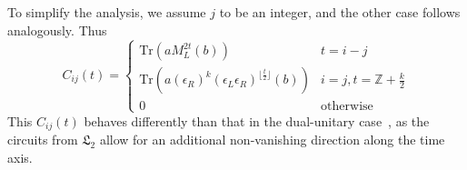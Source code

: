 \documentclass[aps,prx,twocolumn,notitlepage,nofootinbib,nobalancelastpage]{revtex4-2}
\theoremstyle{break}
\newcommand{\1}{\mathbbm{1}}
\theoremstyle{plain}
\theoremstyle{plain}
\theoremstyle{plain}
\newcommand{\pk}[1]{{\color{blue}[#1]}}
\begin{document}
To simplify the analysis, we assume $j$ to be an integer, and the other case follows analogously. Thus
\begin{equation}
C_{ij}(t)=\begin{cases}
\mathrm{Tr}\left(aM_{L}^{2t}(b)\right) & t=i-j\\
\mathrm{Tr}\left(a(\epsilon_{R})^{k}(\epsilon_{L}\epsilon_{R})^{\lfloor\frac{t}{2}\rfloor}(b)\right) & i=j,t=\mathbb{Z}+\frac{k}{2}\\
0 & \mathrm{otherwise}
\end{cases}\label{eq:expression_CF_1site}
\end{equation}
This $C_{ij}(t)$ behaves differently than
that in the dual-unitary case~\cite{bertini2019exact}, %
as the circuits from $\mathfrak{L}_2$ allow for an additional non-vanishing direction along the time axis. 
\end{document}

